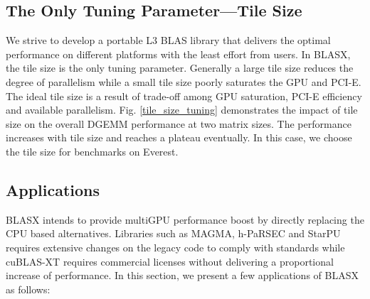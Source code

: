 \documentclass[conference]{IEEEtran}
\begin{document}
\vspace{-0.12in}
\subsection{The Only Tuning Parameter---Tile Size}
\vspace{-0.05in}

We strive to develop a portable L3 BLAS library that delivers the optimal performance on different platforms 
with the least effort from users. In BLASX, the tile size is the only tuning parameter. Generally a large tile 
size reduces the degree of parallelism while a small tile size poorly saturates the GPU and PCI-E. The ideal 
tile size is a result of trade-off among GPU saturation, PCI-E efficiency and available parallelism. 
Fig. \ref{tile_size_tuning} demonstrates the impact of tile size on the overall DGEMM performance at 
two matrix sizes. The performance increases with tile size and reaches a plateau eventually. In this case, 
we choose the tile size  for benchmarks on Everest.

\vspace{-0.12in}
\subsection{Applications}
\vspace{-0.05in}

BLASX intends to provide multiGPU performance boost by directly replacing the CPU based 
alternatives. Libraries such as MAGMA, h-PaRSEC and StarPU requires extensive changes on 
the legacy code to comply with standards while cuBLAS-XT requires commercial licenses without
delivering a proportional increase of performance. In this section, we present a few applications of BLASX as follows:
\end{document}
